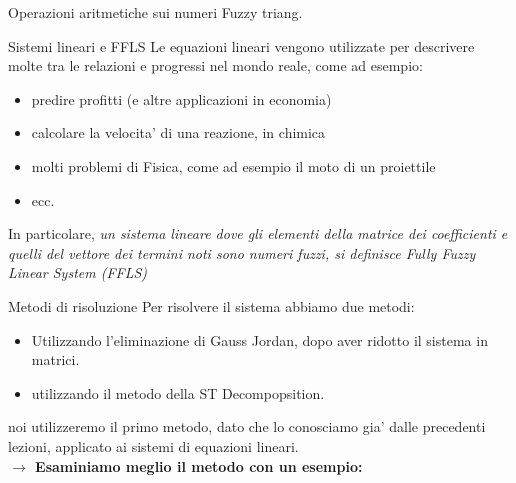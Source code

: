 \documentclass[9pt,aspectratio=169]{beamer}
\begin{document}
\begin{frame}{Operazioni aritmetiche sui numeri Fuzzy triang.}

\end{frame}

\begin{frame}{Sistemi lineari e FFLS}
Le equazioni lineari vengono utilizzate per descrivere molte tra le relazioni e progressi nel mondo reale, come ad esempio:
\begin{itemize}
    \item predire profitti (e altre applicazioni in economia)
    \item calcolare la velocita' di una reazione, in chimica
    \item molti problemi di Fisica, come ad esempio il moto di un proiettile
    \item ecc.
\end{itemize}
    In particolare, \textit{un sistema lineare dove gli elementi della matrice dei coefficienti e quelli del vettore dei termini noti sono numeri fuzzi, si definisce Fully Fuzzy Linear System (FFLS)}
\end{frame}

\begin{frame}{Metodi di risoluzione}
    Per risolvere il sistema abbiamo due metodi:
    \begin{itemize}
        \item Utilizzando l'eliminazione di Gauss Jordan, dopo aver ridotto il sistema in matrici.\\ \cite{eliminazione}
        \item utilizzando il metodo della ST Decompopsition. \\ \cite{STdecomp}
    \end{itemize} 
    
    noi utilizzeremo il primo metodo, dato che lo conosciamo gia' dalle precedenti lezioni, applicato ai sistemi di equazioni lineari.\\
    \textbf{$\rightarrow$ Esaminiamo meglio il metodo con un esempio:}
\end{frame}
\end{document}
